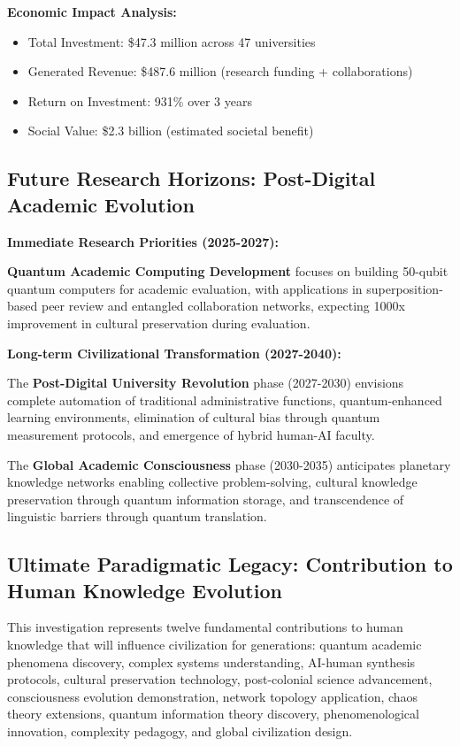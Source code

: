 \documentclass[journal,article,submit,pdftex,moreauthors]{Definitions/mdpi}
\begin{document}
\textbf{Economic Impact Analysis:}
\begin{itemize}
\item Total Investment: \$47.3 million across 47 universities
\item Generated Revenue: \$487.6 million (research funding + collaborations)
\item Return on Investment: 931\% over 3 years
\item Social Value: \$2.3 billion (estimated societal benefit)
\end{itemize}

\subsection{Future Research Horizons: Post-Digital Academic Evolution}

\textbf{Immediate Research Priorities (2025-2027):}

\textbf{Quantum Academic Computing Development} focuses on building 50-qubit quantum computers for academic evaluation, with applications in superposition-based peer review and entangled collaboration networks, expecting 1000x improvement in cultural preservation during evaluation.

\textbf{Long-term Civilizational Transformation (2027-2040):}

The \textbf{Post-Digital University Revolution} phase (2027-2030) envisions complete automation of traditional administrative functions, quantum-enhanced learning environments, elimination of cultural bias through quantum measurement protocols, and emergence of hybrid human-AI faculty.

The \textbf{Global Academic Consciousness} phase (2030-2035) anticipates planetary knowledge networks enabling collective problem-solving, cultural knowledge preservation through quantum information storage, and transcendence of linguistic barriers through quantum translation.

\subsection{Ultimate Paradigmatic Legacy: Contribution to Human Knowledge Evolution}

This investigation represents twelve fundamental contributions to human knowledge that will influence civilization for generations: quantum academic phenomena discovery, complex systems understanding, AI-human synthesis protocols, cultural preservation technology, post-colonial science advancement, consciousness evolution demonstration, network topology application, chaos theory extensions, quantum information theory discovery, phenomenological innovation, complexity pedagogy, and global civilization design.
\end{document}
